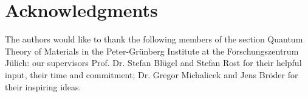 \chapter*{Acknowledgments}

The authors would like to thank the following members of the section Quantum
Theory of Materials in the Peter-Grünberg Institute at the Forschungszentrum
Jülich: our supervisors Prof. Dr. Stefan Blügel and Stefan Rost for their
helpful input, their time and commitment; Dr. Gregor Michalicek and Jens Bröder
for their inspiring ideas.

